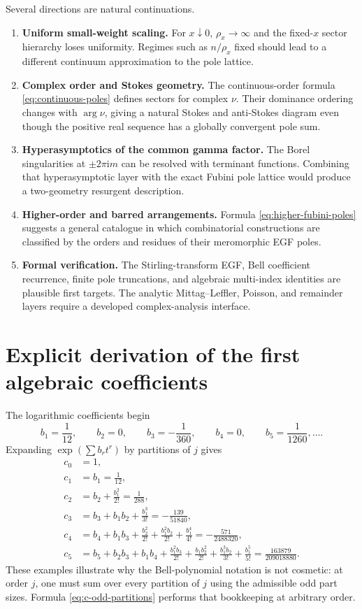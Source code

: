 \documentclass[11pt,a4paper,oneside]{article}
\theoremstyle{definition}
\theoremstyle{remark}
\newcommand{\ii}{\mathrm{i}}
\begin{document}
Several directions are natural continuations.
\begin{enumerate}
 \item \textbf{Uniform small-weight scaling.}  For $x\downarrow0$,
       $\rho_x\to\infty$ and the fixed-$x$ sector hierarchy loses uniformity.
       Regimes such as $n/\rho_x$ fixed should lead to a different continuum
       approximation to the pole lattice.
 \item \textbf{Complex order and Stokes geometry.}  The continuous-order
       formula \cref{eq:continuous-poles} defines sectors for complex $\nu$.
       Their dominance ordering changes with $\arg\nu$, giving a natural
       Stokes and anti-Stokes diagram even though the positive real sequence
       has a globally convergent pole sum.
 \item \textbf{Hyperasymptotics of the common gamma factor.}  The Borel
       singularities at $\pm2\pi\ii m$ can be resolved with terminant
       functions.  Combining that hyperasymptotic layer with the exact Fubini
       pole lattice would produce a two-geometry resurgent description.
 \item \textbf{Higher-order and barred arrangements.}  Formula
       \cref{eq:higher-fubini-poles} suggests a general catalogue in which
       combinatorial constructions are classified by the orders and residues
       of their meromorphic EGF poles.
 \item \textbf{Formal verification.}  The Stirling-transform EGF, Bell
       coefficient recurrence, finite pole truncations, and algebraic
       multi-index identities are plausible first targets.  The analytic
       Mittag--Leffler, Poisson, and remainder layers require a developed
       complex-analysis interface.
\end{enumerate}

\appendix

\section{Explicit derivation of the first algebraic coefficients}
\label{app:first-coefficients}
The logarithmic coefficients begin
\[
 b_1=\frac1{12},\qquad b_2=0,\qquad
 b_3=-\frac1{360},\qquad b_4=0,\qquad
 b_5=\frac1{1260},\ldots.
\]
Expanding $\exp(\sum b_rt^r)$ by partitions of $j$ gives
\begin{align*}
 c_0&=1,\\
 c_1&=b_1=\frac1{12},\\
 c_2&=b_2+\frac{b_1^2}{2!}=\frac1{288},\\
 c_3&=b_3+b_1b_2+\frac{b_1^3}{3!}
     =-\frac{139}{51840},\\
 c_4&=b_4+b_1b_3+\frac{b_2^2}{2!}
      +\frac{b_1^2b_2}{2!}+\frac{b_1^4}{4!}
     =-\frac{571}{2488320},\\
 c_5&=b_5+b_2b_3+b_1b_4
      +\frac{b_1^2b_3}{2!}
      +\frac{b_1b_2^2}{2!}
      +\frac{b_1^3b_2}{3!}
      +\frac{b_1^5}{5!}
     =\frac{163879}{209018880}.
\end{align*}
These examples illustrate why the Bell-polynomial notation is not cosmetic:
at order $j$, one must sum over every partition of $j$ using the admissible
odd part sizes.  Formula \cref{eq:c-odd-partitions} performs that bookkeeping
at arbitrary order.
\end{document}
